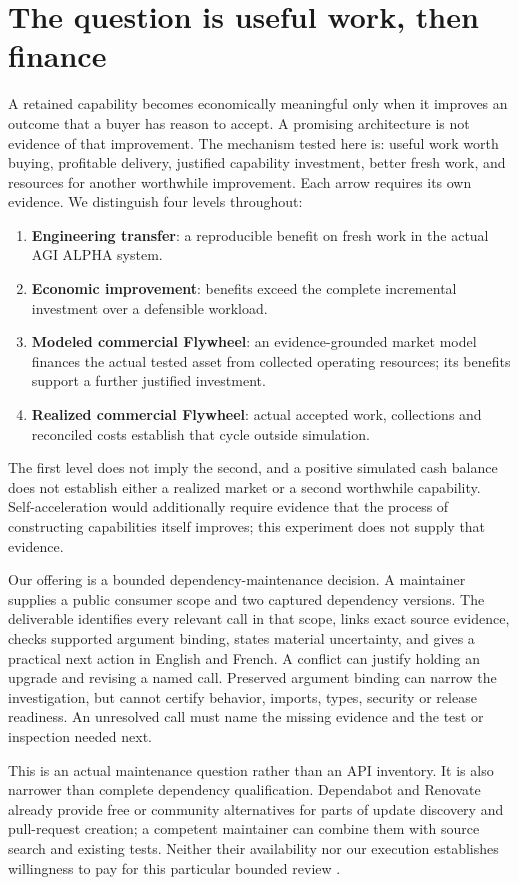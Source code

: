 \documentclass[11pt,a4paper]{article}
\begin{document}
\section{The question is useful work, then finance}
A retained capability becomes economically meaningful only when it improves an outcome that a buyer has reason to accept. A promising architecture is not evidence of that improvement. The mechanism tested here is: useful work worth buying, profitable delivery, justified capability investment, better fresh work, and resources for another worthwhile improvement. Each arrow requires its own evidence. We distinguish four levels throughout:
\begin{enumerate}
\item \textbf{Engineering transfer}: a reproducible benefit on fresh work in the actual AGI ALPHA system.
\item \textbf{Economic improvement}: benefits exceed the complete incremental investment over a defensible workload.
\item \textbf{Modeled commercial Flywheel}: an evidence-grounded market model finances the actual tested asset from collected operating resources; its benefits support a further justified investment.
\item \textbf{Realized commercial Flywheel}: actual accepted work, collections and reconciled costs establish that cycle outside simulation.
\end{enumerate}
The first level does not imply the second, and a positive simulated cash balance does not establish either a realized market or a second worthwhile capability. Self-acceleration would additionally require evidence that the process of constructing capabilities itself improves; this experiment does not supply that evidence.

Our offering is a bounded dependency-maintenance decision. A maintainer supplies a public consumer scope and two captured dependency versions. The deliverable identifies every relevant call in that scope, links exact source evidence, checks supported argument binding, states material uncertainty, and gives a practical next action in English and French. A conflict can justify holding an upgrade and revising a named call. Preserved argument binding can narrow the investigation, but cannot certify behavior, imports, types, security or release readiness. An unresolved call must name the missing evidence and the test or inspection needed next.

This is an actual maintenance question rather than an API inventory. It is also narrower than complete dependency qualification. Dependabot and Renovate already provide free or community alternatives for parts of update discovery and pull-request creation; a competent maintainer can combine them with source search and existing tests. Neither their availability nor our execution establishes willingness to pay for this particular bounded review \cite{dependabot,renovate}.
\end{document}

